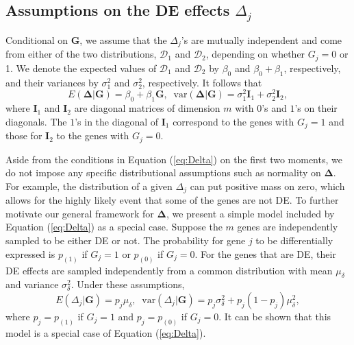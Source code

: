 \documentclass[useAMS,usenatbib, galley]{biom}
\begin{document}
	\subsection{Assumptions on the DE effects $\Delta_j$}\label{subsection:DeltaModel}
	Conditional on $\bm G$, we assume that the $\Delta_j$'s are mutually independent and come from either of the two distributions, $\mathscr{D}_1$ and $\mathscr{D}_2$, depending on whether $G_j=0$ or 1. We denote the expected values of $\mathscr{D}_1$ and $\mathscr{D}_2$ by $\beta_0$ and $\beta_0+\beta_1$, respectively, and their variances by $\sigma_1^2$ and $\sigma_2^2$, respectively. It follows that 
	\begin{equation}
		\label{eq:Delta}
		E(\bm \Delta|\bm G)=\beta_0 + \beta_1 \bm G,\;\; \mbox{var}(\bm \Delta|\bm G) = \sigma_1^2\bm I_1+\sigma_2^2\bm I_2,
	\end{equation} 
	where $\bm I_1$ and $\bm I_2$ are diagonal matrices of dimension $m$ with $0$'s and $1$'s on their diagonals. The $1$'s in the diagonal of $\bm I_1$ correspond to the genes with $G_j=1$ and those for $\bm I_2$ to the genes with $G_j=0$.
	
	Aside from the conditions in Equation (\ref{eq:Delta}) on the first two moments, we do not impose any specific distributional assumptions such as normality on $\bm \Delta$. For example, the distribution of a given $\Delta_j$ can put positive mass on zero, which allows for the highly likely event that some of the genes are not DE. To further motivate our general framework for $\bm \Delta$, we present a simple model included by Equation (\ref{eq:Delta}) as a special case. Suppose the $m$ genes are independently sampled to be either DE or not. The probability for gene $j$ to be differentially expressed is $p_{(1)}$ if $G_j=1$ or $p_{(0)}$ if $G_j=0$. For the genes that are DE, their DE effects are sampled independently from a common distribution with mean $\mu_\delta$ and variance $\sigma^2_\delta$. Under these assumptions, 
	\begin{equation}
		\label{eq:DeltaBinom}
		E(\Delta_j|\bm G) = p_j\mu_{\delta},\;\; \mbox{var}(\Delta_j|\bm G)= p_j\sigma_{\delta}^2 + p_j(1-p_j)\mu_{\delta}^2,
	\end{equation}
	where $p_j=p_{(1)}$ if $G_j=1$ and $p_j=p_{(0)}$ if $G_j=0$. It can be shown that this model is a special case of Equation (\ref{eq:Delta}).
	
\end{document}
